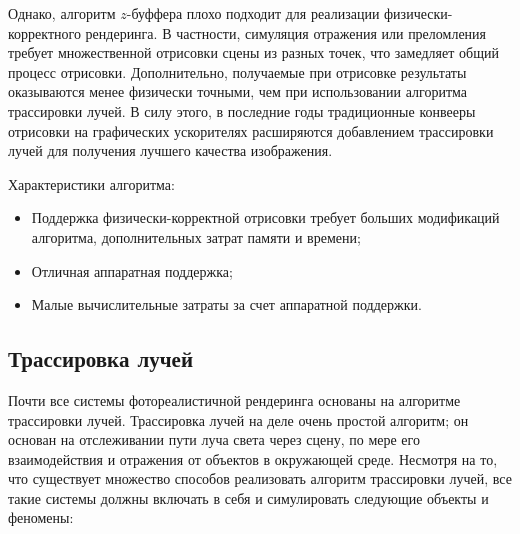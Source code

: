 Однако, алгоритм $z$-буффера плохо подходит для реализации физически-корректного рендеринга.
В частности, симуляция отражения или преломления требует множественной отрисовки сцены
из разных точек, что замедляет общий процесс отрисовки. Дополнительно, получаемые при отрисовке
результаты оказываются менее физически точными, чем при использовании алгоритма трассировки лучей. 
В силу этого, в последние годы традиционные конвееры отрисовки на графических ускорителях 
расширяются добавлением трассировки лучей для получения лучшего качества изображения\cite{FoCG}.

Характеристики алгоритма:
\begin{itemize}[label*=---]
    \item Поддержка физически-корректной отрисовки требует больших модификаций алгоритма,
        дополнительных затрат памяти и времени;
    \item Отличная аппаратная поддержка;
    \item Малые вычислительные затраты за счет аппаратной поддержки.
\end{itemize}

\subsection{Трассировка лучей}
Почти все системы фотореалистичной рендеринга основаны на алгоритме трассировки лучей. 
Трассировка лучей на деле очень простой алгоритм; он основан на отслеживании пути луча света 
через сцену, по мере его взаимодействия и отражения от объектов в окружающей среде.
Несмотря на то, что существует множество способов реализовать алгоритм трассировки лучей, 
все такие системы должны включать в себя и симулировать следующие объекты и феномены:

